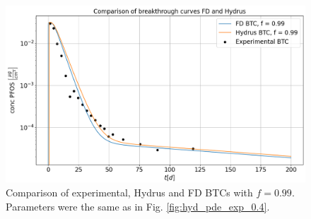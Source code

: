 \begin{figure}
	\centering
	\includegraphics[scale=0.5]{images/hyd_pde_exp_0.99.png}
\caption[Comparison of experimental, Hydrus and FD BTCs, $f= 0.99$]{Comparison of experimental, Hydrus and FD BTCs with $f=0.99$. Parameters were the same as in Fig. \ref{fig:hyd_pde_exp_0.4}.}
\label{fig:hyd_pde_exp_0.99}
\end{figure}

